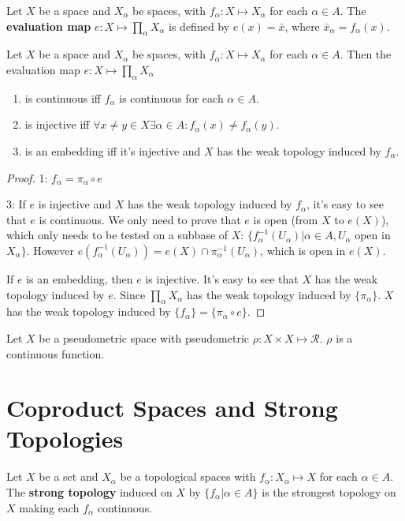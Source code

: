 \documentclass[12pt]{book}
\begin{document}
\begin{definition}
	Let $X$ be a space and $X_\alpha$ be spaces, with $f_\alpha:X\mapsto X_\alpha$ for each $\alpha\in A$. The {\bf evaluation map} $e:X\mapsto \prod_\alpha X_\alpha$ is defined by $e(x)=\bar x$, where $\bar x_\alpha=f_\alpha(x)$.
\end{definition}

\begin{theorem}
	Let $X$ be a space and $X_\alpha$ be spaces, with $f_\alpha:X\mapsto X_\alpha$ for each $\alpha\in A$. Then the evaluation map $e:X\mapsto \prod_\alpha X_\alpha$
	\begin{enumerate}
		\item is continuous iff $f_\alpha$ is continuous for each $\alpha\in A$.
		\item is injective iff $\forall x\neq y\in X\exists \alpha\in A:f_\alpha(x)\neq f_\alpha(y)$.
		\item is an embedding iff it's injective and $X$ has the weak topology induced by $f_\alpha$.
	\end{enumerate}
	\label{thm:weak_embed}
\end{theorem}
\begin{proof}
	1: $f_\alpha=\pi_\alpha\circ e$
	
	3: If $e$ is injective and $X$ has the weak topology induced by $f_\alpha$, it's easy to see that $e$ is continuous. We only need to prove that $e$ is open (from $X$ to $e(X)$), which only needs to be tested on a subbase of $X$: $\{f^{-1}_\alpha(U_\alpha)|\alpha\in A, U_\alpha$ open in $X_\alpha\}$. However $e(f^{-1}_\alpha(U_\alpha))=e(X)\cap \pi_\alpha^{-1}(U_\alpha)$, which is open in $e(X)$.
	
	If $e$ is an embedding, then $e$ is injective. It's easy to see that $X$ has the weak topology induced by $e$. Since $\prod_\alpha X_\alpha$ has the weak topology induced by $\{\pi_\alpha\}$. $X$ has the weak topology induced by $\{f_\alpha\}=\{\pi_\alpha\circ e\}$.
\end{proof}

\begin{theorem}
	Let $X$ be a pseudometric space with pseudometric $\rho:X\times X\mapsto \mathcal R$. $\rho$ is a continuous function.
\end{theorem}
\section{Coproduct Spaces and Strong Topologies}

\begin{definition}
	Let $X$ be a set and $X_\alpha$ be a topological spaces with $f_\alpha:X_\alpha \mapsto X$ for each $\alpha\in A$. The {\bf strong topology} induced on $X$ by $\{f_\alpha|\alpha\in A\}$ is the strongest topology on $X$ making each $f_\alpha$ continuous.
\end{definition}
\end{document}

